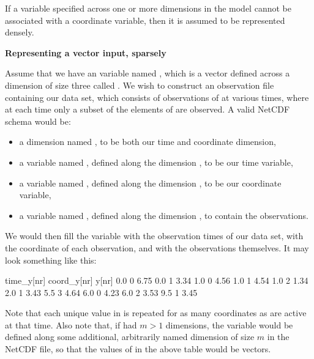 
If a variable specified across one or more dimensions in the model cannot be
associated with a coordinate variable, then it is assumed to be represented
densely.

\begin{example}
\noindent \textbf{Representing a vector input, sparsely}

Assume that we have an  variable named , which is a vector
defined across a dimension of size three called . We wish to construct
an observation file containing our data set, which consists of observations of
 at various times, where at each time only a subset of the elements of
 are observed. A valid NetCDF schema would be:
\begin{itemize}
\item a dimension named , to be both our time and coordinate
  dimension,
\item a variable named , defined along the dimension ,
  to be our time variable,
\item a variable named , defined along the dimension ,
  to be our coordinate variable,
\item a variable named , defined along the dimension , to
  contain the observations.
\end{itemize}
We would then fill the variable  with the observation times of
our data set,  with the coordinate of each observation, and
 with the observations themselves. It may look something like this:

\begin{cmdcode}
time_y[nr]   coord_y[nr]      y[nr]
       0.0             0       6.75
       0.0             1       3.34
       1.0             0       4.56
       1.0             1       4.54
       1.0             2       1.34
       2.0             1       3.43
       5.5             3       4.64
       6.0             0       4.23
       6.0             2       3.53
       9.5             1       3.45
\end{cmdcode}

Note that each unique value in  is repeated for as many
coordinates as are active at that time. Also note that, if  had $m >
1$ dimensions, the  variable would be defined along some
additional, arbitrarily named dimension of size $m$ in the NetCDF file, so
that the values of  in the above table would be vectors.
\end{example}

